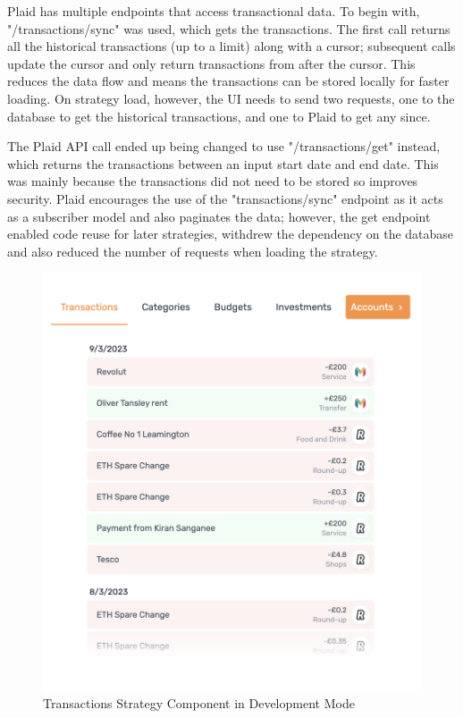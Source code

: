 Plaid has multiple endpoints that access transactional data. To begin with, "/transactions/sync" was used, which gets the transactions. The first call returns all the historical transactions (up to a limit) along with a cursor; subsequent calls update the cursor and only return transactions from after the cursor. This reduces the data flow and means the transactions can be stored locally for faster loading. On strategy load, however, the UI needs to send two requests, one to the database to get the historical transactions, and one to Plaid to get any since.

The Plaid API call ended up being changed to use "/transactions/get" instead, which returns the transactions between an input start date and end date. This was mainly because the transactions did not need to be stored so improves security. Plaid encourages the use of the "transactions/sync" endpoint as it acts as a subscriber model and also paginates the data; however, the get endpoint enabled code reuse for later strategies, withdrew the dependency on the database and also reduced the number of requests when loading the strategy.

\begin{figure}[H]
	\centering
	\includegraphics[width=\textwidth]{images/transactions_development.png}
	\caption{Transactions Strategy Component in Development Mode}
	\label{fig:TransactionsStrategy}
\end{figure}

